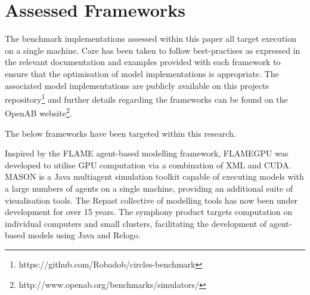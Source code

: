 \section{Assessed Frameworks\label{sec:assessed-frameworks}}
The benchmark implementations assessed within this paper all target execution on a single machine. Care has been taken to follow best-practises as expressed in the relevant documentation and examples provided with each framework to ensure that the optimisation of model implementations is appropriate. The associated model implementations are publicly available on this projects repository\footnote{https://github.com/Robadob/circles-benchmark} and further details regarding the frameworks can be found on the OpenAB website\footnote{http://www.openab.org/benchmarks/simulators/}.

The below frameworks have been targeted within this research.

Inspired by the FLAME agent-based modelling framework, FLAMEGPU  was developed to utilise GPU computation via a combination of XML and CUDA\cite{RR082}. MASON is a Java multiagent simulation toolkit capable of executing models with a large numbers of agents on a single machine, providing an additional suite of visualisation tools\cite{LC*04}. The Repast collective of modelling tools has now been under development for over 15 years. The symphony product targets computation on individual computers and small clusters, facilitating the development of agent-based models using Java and Relogo\cite{repsat2013}.